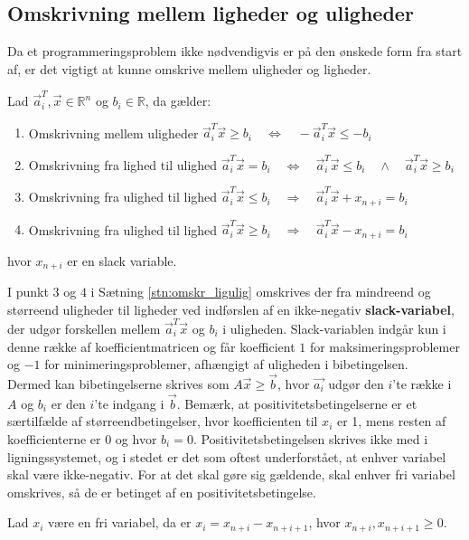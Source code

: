 \subsection{Omskrivning mellem ligheder og uligheder}
Da et programmeringsproblem ikke nødvendigvis er på den ønskede form fra start af, er det vigtigt at kunne omskrive mellem uligheder og ligheder. 

\begin{stn}
Lad $\vec{a}_i^T,\vec{x} \in \mathds{R}^n$ og $b_i \in \mathds{R}$, da gælder:
\begin{enumerate}
\item Omskrivning mellem uligheder \qquad \quad $\vec{a}_i^T\vec{x} \geq b_i \quad \Leftrightarrow \quad -\vec{a}_i^T\vec{x} \leq -b_i$
\item Omskrivning fra lighed til ulighed \qquad  $\vec{a}_i^T\vec{x} = b_i \quad \Leftrightarrow  \quad  \vec{a}_i^T\vec{x} \leq b_i \quad \wedge \quad  \vec{a}_i^T\vec{x} \geq b_i$
\item Omskrivning fra ulighed til lighed \qquad $\vec{a}_i^T \vec{x}  \leq b_i \quad \Rightarrow \quad  \vec{a}_i^T \vec{x}  +  x_{n+i}  = b_i$
\item Omskrivning fra ulighed til lighed \qquad $\vec{a}_i^T \vec{x}  \geq b_i \quad \Rightarrow \quad  \vec{a}_i^T \vec{x}  - x_{n+i}  = b_i$
\end{enumerate}
hvor $x_{n+i}$ er en slack variable.
\label{stn:omskr_ligulig} 
\end{stn}

I punkt $3$ og $4$ i Sætning \ref{stn:omskr_ligulig} omskrives der fra mindreend og størreend uligheder til ligheder ved indførslen af en ikke-negativ \textbf{slack-variabel}, der udgør forskellen mellem $\vec{a}_i^T\vec{x}$ og $b_i$ i uligheden. Slack-variablen indgår kun i denne række af koefficientmatricen og får koefficient $1$ for maksimeringsproblemer og $-1$ for minimeringsproblemer, afhængigt af uligheden i bibetingelsen. \\

Dermed kan bibetingelserne skrives som $A\vec{x}\geq \vec{b}$, hvor $\vec{a_i}$ udgør den $i$'te række i $A$ og $b_i$ er den $i$'te indgang i $\vec{b}$.
Bemærk, at positivitetsbetingelserne er et særtilfælde af størreendbetingelser, hvor koefficienten til $x_i$ er 1, mens resten af koefficienterne er 0 og hvor $b_i=0$.
Positivitetsbetingelsen skrives ikke med i ligningssystemet, og i stedet er det som oftest underforstået, at enhver variabel skal være ikke-negativ.
For at det skal gøre sig gældende, skal enhver fri variabel omskrives, så de er betinget af en positivitetsbetingelse.
\begin{stn}
Lad $x_i$ være en fri variabel, da er $x_i = x_{n+i}-x_{n+i+1}$, hvor $x_{n+i},x_{n+i+1}\geq 0$.
\end{stn}

